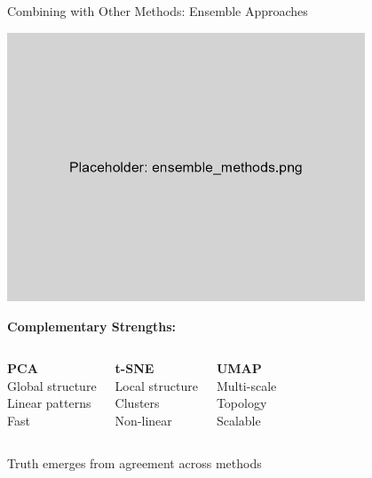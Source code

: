 \documentclass[aspectratio=169]{beamer}
\begin{document}
\begin{frame}{Combining with Other Methods: Ensemble Approaches}
\begin{center}
\includegraphics[width=0.8\textwidth]{./Figures/ensemble_methods.png}
\end{center}

\textbf{Complementary Strengths:}
\begin{columns}
\textbf{PCA}\\
Global structure\\
Linear patterns\\
Fast

\textbf{t-SNE}\\
Local structure\\
Clusters\\
Non-linear

\textbf{UMAP}\\
Multi-scale\\
Topology\\
Scalable
\end{columns}

\colorbox{green!30}{Truth emerges from agreement across methods}
\end{frame}
\end{document}
